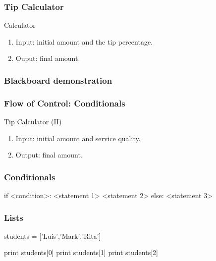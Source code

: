 \begin{frame}[fragile]
\frametitle{Tip Calculator}

\begin{block}{Calculator}
\begin{enumerate}
\item Input: initial amount and the tip percentage.
\item Ouput: final amount.
\end{enumerate}
\end{block}
\end{frame}

\begin{frame}[fragile]
\frametitle{Blackboard demonstration}

\end{frame}

\begin{frame}[fragile]
\frametitle{Flow of Control: Conditionals}

\begin{block}{Tip Calculator (II)}
\begin{enumerate}
\item Input: initial amount and service quality.
\item Output: final amount.
\end{enumerate}
\end{block}


\end{frame}

\begin{frame}[fragile]
\frametitle{Conditionals}

\begin{python}

if <condition>:
    <statement 1>
    <statement 2>
else:
    <statement 3>

\end{python}
\end{frame}

\begin{frame}[fragile]
\frametitle{Lists}

\begin{python}

students = ['Luis','Mark','Rita']

print students[0]
print students[1]
print students[2]
\end{python}

\end{frame}

